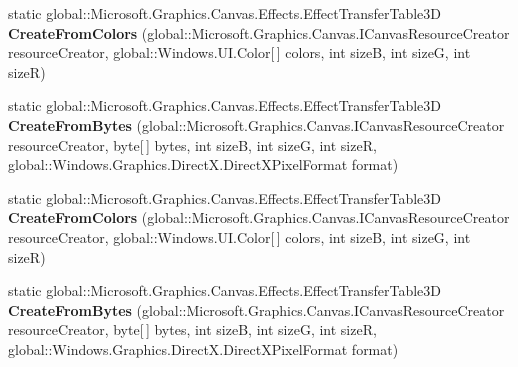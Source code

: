 \begin{DoxyCompactItemize}
\item 
\mbox{\label{class_microsoft_1_1_graphics_1_1_canvas_1_1_effects_1_1_effect_transfer_table3_d_a9057219ec2949dd662066c70f1a5432e}} 
static global\+::\+Microsoft.\+Graphics.\+Canvas.\+Effects.\+Effect\+Transfer\+Table3D {\bfseries Create\+From\+Colors} (global\+::\+Microsoft.\+Graphics.\+Canvas.\+I\+Canvas\+Resource\+Creator resource\+Creator, global\+::\+Windows.\+U\+I.\+Color\mbox{[}$\,$\mbox{]} colors, int sizeB, int sizeG, int sizeR)
\item 
\mbox{\label{class_microsoft_1_1_graphics_1_1_canvas_1_1_effects_1_1_effect_transfer_table3_d_a710783796df3cf65dfda645371d857cb}} 
static global\+::\+Microsoft.\+Graphics.\+Canvas.\+Effects.\+Effect\+Transfer\+Table3D {\bfseries Create\+From\+Bytes} (global\+::\+Microsoft.\+Graphics.\+Canvas.\+I\+Canvas\+Resource\+Creator resource\+Creator, byte\mbox{[}$\,$\mbox{]} bytes, int sizeB, int sizeG, int sizeR, global\+::\+Windows.\+Graphics.\+Direct\+X.\+Direct\+X\+Pixel\+Format format)
\item 
\mbox{\label{class_microsoft_1_1_graphics_1_1_canvas_1_1_effects_1_1_effect_transfer_table3_d_a9057219ec2949dd662066c70f1a5432e}} 
static global\+::\+Microsoft.\+Graphics.\+Canvas.\+Effects.\+Effect\+Transfer\+Table3D {\bfseries Create\+From\+Colors} (global\+::\+Microsoft.\+Graphics.\+Canvas.\+I\+Canvas\+Resource\+Creator resource\+Creator, global\+::\+Windows.\+U\+I.\+Color\mbox{[}$\,$\mbox{]} colors, int sizeB, int sizeG, int sizeR)
\item 
\mbox{\label{class_microsoft_1_1_graphics_1_1_canvas_1_1_effects_1_1_effect_transfer_table3_d_a710783796df3cf65dfda645371d857cb}} 
static global\+::\+Microsoft.\+Graphics.\+Canvas.\+Effects.\+Effect\+Transfer\+Table3D {\bfseries Create\+From\+Bytes} (global\+::\+Microsoft.\+Graphics.\+Canvas.\+I\+Canvas\+Resource\+Creator resource\+Creator, byte\mbox{[}$\,$\mbox{]} bytes, int sizeB, int sizeG, int sizeR, global\+::\+Windows.\+Graphics.\+Direct\+X.\+Direct\+X\+Pixel\+Format format)
\item 
\mbox{\label{class_microsoft_1_1_graphics_1_1_canvas_1_1_effects_1_1_effect_transfer_table3_d_a9057219ec2949dd662066c70f1a5432e}} 

\end{DoxyCompactItemize}
